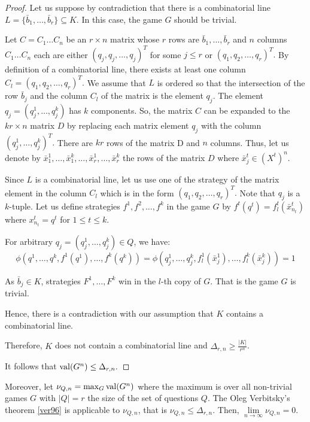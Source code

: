 \begin{proof}
Let us suppose by contradiction that there is a combinatorial line $L=\{\bar{b}_1, \ldots, \bar{b}_r \} \subseteq K.$ In this case,  the game  $G$ should be trivial.
 
Let $C=C_1\ldots C_n$ be an $r \times n$ matrix whose $r$ rows are $\bar{b}_1, \ldots, \bar{b}_r$ and $n$ columns $C_1\ldots C_n$ each are either $(q_j,q_j,\ldots,q_j)^T$ for some $j\leq r$ or $(q_1,q_2,\ldots,q_r)^T.$ By definition of a combinatorial line, there exists at least one column $C_l=(q_1,q_2,\ldots,q_r)^T.$ We assume that $L$ is ordered so that the intersection of the row $\bar{b}_j$ and the column $C_l$ of the matrix is the element $q_j.$ The element $q_j=(q_j^1,\ldots, q_j^k)$ has $k$ components. So, the  matrix $C$ can be expanded to the $kr \times n$ matrix $D$ by replacing each matrix element $q_j$ with the column $(q_j^1,\ldots, q_j^k)^T.$ There are $kr$ rows of the matrix D and $n$ columns. Thus, let us denote by $\bar{x}_1^1, \ldots, \bar{x}_1^k, \ldots, \bar{x}_r^1, \ldots, \bar{x}_r^k$ the rows of the matrix $D$ where $\bar{x}_j^t \in  (X^t)^n.$

Since $L$ is a combinatorial line, let us use one of the strategy of the matrix element in the column $C_l$ which is in the form $(q_1,q_2,\ldots,q_r)^T.$  Note that $q_j$ is a $k$-tuple. 
Let us define strategies $f^1,f^2, \ldots, f^k$ in the game $G$ by $f^t(q^t)=f_l^t(\bar{x}_{n_t}^t)$ where $x_{n_t}^t=q^t$ for $1\leq t \leq k.$ 

For  arbitrary $q_j= (q_j^1,\ldots, q_j^k) \in Q$, we have:
$$\phi (q^1,\ldots, q^k, f^1(q^1), \ldots, f^k(q^k))= \phi (q_j^1,\ldots, q_j^k, f_l^1(\bar{x}_j^1), \ldots, f_l^k(\bar{x}_j^k))=1$$

As $\bar{b}_j \in K$,
strategies $F^1, \ldots, F^k$ win in  the $l$-th copy of $G$. That is the game $G$ is  trivial. 

Hence, there is a contradiction with our assumption that $K$ contains a combinatorial line.

Therefore, $K$ does not contain a combinatorial line and $\Delta_{r,n} \geq  \frac{|K|}{r^n}$.

It follows that $\mathrm{val} (G^n) \leq \Delta_{r,n}.$
\end{proof}

Moreover, let $\nu_{Q,n}=\max_G \mathrm{val} (G^n)$ where the maximum is over all non-trivial games $G$ with $|Q|=r$ the size of the set of questions $Q.$ 
The Oleg Verbitsky's theorem \eqref{ver96} is applicable to $\nu_{Q,n}$, that is $\nu_{Q,n} \leq \Delta_{r,n}.$
Then, $\lim\limits_{n\longrightarrow \infty} \nu_{Q,n}=0.$

